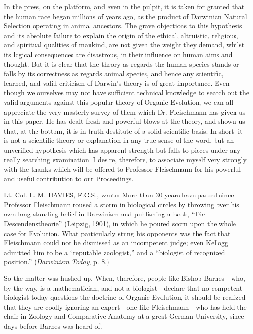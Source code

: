 In the press, on the platform, and even in the pulpit, it is taken for granted that the human
race began millions of years ago, as the product of Darwinian Natural Selection operating in
animal ancestors. The grave objections to this hypothesis and its absolute failure to explain
the origin of the ethical, altruistic, religious, and spiritual qualities of mankind, are not given
the weight they demand, whilst its logical consequences are disastrous, in their influence on
human aims and thought. But it is clear that the theory as regards the human species stands or
falls by its correctness as regards animal species, and hence any scientific, learned, and valid
criticism of Darwin's theory is of great importance. Even though we ourselves may not have
sufficient technical knowledge to search out the valid arguments against this popular theory
of Organic Evolution, we can all appreciate the very masterly survey of them which Dr.
Fleischmann has given us in this paper. He has dealt fresh and powerful blows at the theory,
and shown us that, at the bottom, it is in truth destitute of a solid scientific basis. In short, it is
not a scientific theory or explanation in any true sense of the word, but an unverified
hypothesis which has apparent strength but falls to pieces under any really searching
examination. I desire, therefore, to associate myself very strongly with the thanks which will
be offered to Professor Fleischmann for his powerful and useful contribution to our
Proceedings.

Lt.-Col. L. M. DAVIES, F.G.S., wrote: More than 30 years have passed since Professor
Fleischmann roused a storm in biological circles by throwing over his own long-standing
belief in Darwinism and publishing a book, ``Die Descendenztheorie'' (Leipzig, 1901), in
which he poured scorn upon the whole case for Evolution. What particularly stung his
opponents was the fact that Fleischmann could not be dismissed as an incompetent judge;
even Kellogg admitted him to be a ``reputable zoologist,'' and a ``biologist of recognized
position.'' (\textit{Darwinism Today}, p. 8.)

So the matter was hushed up. When, therefore, people like Bishop Barnes—who, by the way,
is a mathematician, and not a biologist—declare that no competent biologist today questions
the doctrine of Organic Evolution, it should be realized that they are coolly ignoring an
expert—one like Fleischmann—who has held the chair in Zoology and Comparative
Anatomy at a great German University, since days before Barnes was heard of.

